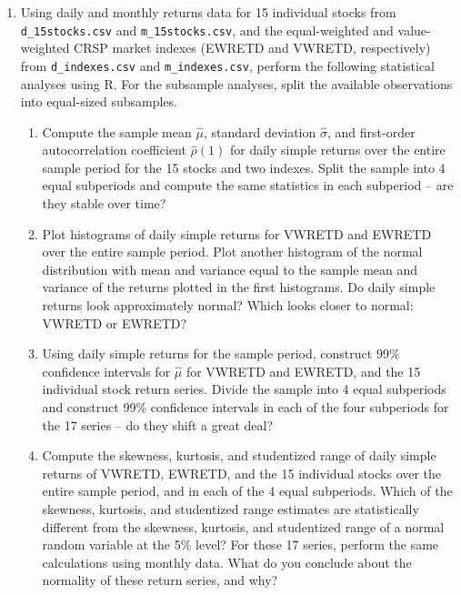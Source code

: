 \documentclass[11pt]{article}
\begin{document}
\begin{enumerate}
\item Using daily and monthly returns data for 15 individual stocks from {\tt d\_15stocks.csv} and {\tt m\_15stocks.csv}, and the equal-weighted and value-weighted CRSP market indexes (EWRETD and VWRETD, respectively) from {\tt d\_indexes.csv} and {\tt m\_indexes.csv}, perform the following statistical analyses using R. For the subsample analyses, split the available observations into equal-sized subsamples.
\begin{enumerate}
\item Compute the sample mean $\hat\mu$, standard deviation $\hat{\sigma}$, and first-order autocorrelation coefficient $\hat{\rho}(1)$ for daily simple returns over the entire sample period for the 15 stocks and two indexes. Split the sample into 4 equal subperiods and compute the same statistics in each subperiod -- are they stable over time?
\item Plot histograms of daily simple returns for VWRETD and EWRETD over the entire sample period. Plot another histogram of the normal distribution with mean and variance equal to the sample mean and variance of the returns plotted in the first histograms. Do daily simple returns look approximately normal? Which looks closer to normal: VWRETD or EWRETD?
\item Using daily simple returns for the sample period, construct 99\% confidence intervals for $\hat{\mu}$ for VWRETD and EWRETD, and the 15 individual stock return series. Divide the sample into 4 equal subperiods and construct 99\% confidence intervals in each of the four subperiods for the 17 series -- do they shift a great deal?
\item Compute the skewness, kurtosis, and studentized range of daily simple returns of VWRETD, EWRETD, and the 15 individual stocks over the entire sample period, and in each of the 4 equal subperiods. Which of the skewness, kurtosis, and studentized range estimates are statistically different from the skewness, kurtosis, and studentized range of a normal random variable at the 5\% level? For these 17 series, perform the same calculations using monthly data. What do you conclude about the normality of these return series, and why?
\end{enumerate}


\end{enumerate}
\end{document}
